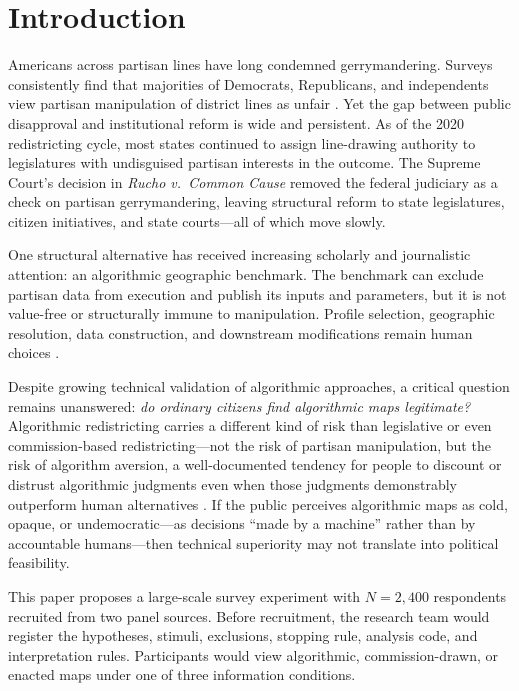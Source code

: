\section{Introduction}
\label{sec:introduction}

Americans across partisan lines have long condemned gerrymandering. Surveys consistently find that majorities of Democrats, Republicans, and independents view partisan manipulation of district lines as unfair \citep{pew2017redistricting,gallup2019gerrymander}. Yet the gap between public disapproval and institutional reform is wide and persistent. As of the 2020 redistricting cycle, most states continued to assign line-drawing authority to legislatures with undisguised partisan interests in the outcome. The Supreme Court's decision in \textit{Rucho v.\ Common Cause} \citeyearpar{rucho2019} removed the federal judiciary as a check on partisan gerrymandering, leaving structural reform to state legislatures, citizen initiatives, and state courts---all of which move slowly.

One structural alternative has received increasing scholarly and journalistic
attention: an algorithmic geographic benchmark. The benchmark can exclude
partisan data from execution and publish its inputs and parameters, but it is
not value-free or structurally immune to manipulation. Profile selection,
geographic resolution, data construction, and downstream modifications remain
human choices \citep{dellaLibera2026recursive}.

Despite growing technical validation of algorithmic approaches, a critical question remains unanswered: \textit{do ordinary citizens find algorithmic maps legitimate?} Algorithmic redistricting carries a different kind of risk than legislative or even commission-based redistricting---not the risk of partisan manipulation, but the risk of algorithm aversion, a well-documented tendency for people to discount or distrust algorithmic judgments even when those judgments demonstrably outperform human alternatives \citep{dietvorst2015algorithm}. If the public perceives algorithmic maps as cold, opaque, or undemocratic---as decisions ``made by a machine'' rather than by accountable humans---then technical superiority may not translate into political feasibility.

This paper proposes a large-scale survey experiment with $N=2{,}400$
respondents recruited from two panel sources. Before recruitment, the research
team would register the hypotheses, stimuli, exclusions, stopping rule,
analysis code, and interpretation rules. Participants would view algorithmic,
commission-drawn, or enacted maps under one of three information conditions.

